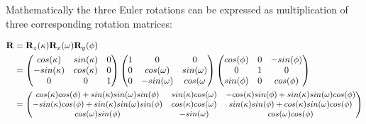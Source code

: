 \documentclass[a4paper,12pt]{article}
\newcommand{\ematr}[1]{
{\bf #1}
}
\newcommand{\escal}[1]{
{\it #1}
}
\begin{document}
Mathematically the three Euler rotations can be expressed as multiplication of three corresponding
rotation matrices:


 \begin{equation}
 \begin{split}
\ematr{R} &= \ematr{R}_{z}(\escal{\kappa}) \ematr{R}_{x}(\escal{\omega}) \ematr{R}_{y}(\escal{\phi}) \\
	  &= \begin{pmatrix}
	      cos(\escal{\kappa}) & sin(\escal{\kappa}) & 0 \\
	      -sin(\escal{\kappa}) & cos(\escal{\kappa}) & 0 \\
	      0 & 0 & 1
	      \end{pmatrix}
	      \begin{pmatrix}
	      1 & 0 & 0 \\
	      0 & cos(\escal{\omega}) & sin(\escal{\omega}) \\
	      0 & -sin(\escal{\omega}) & cos(\escal{\omega} 
	      \end{pmatrix}
	      \begin{pmatrix}
	      cos(\escal{\phi}) & 0 & -sin(\escal{\phi}) \\
	      0 & 1 & 0 \\
	      sin(\phi) & 0 & cos(\phi)      
	      \end{pmatrix} \\
	  &=  
	      \small
	      \begin{pmatrix}
	      cos(\escal{\kappa}) cos(\escal{\phi}) + sin(\escal{\kappa}) sin(\escal{\omega}) sin(\escal{\phi}) & 
	      sin(\escal{\kappa}) cos(\escal{\omega})  & 
	      -cos(\escal{\kappa}) sin(\escal{\phi}) + sin(\escal{\kappa}) sin(\escal{\omega}) cos(\escal{\phi}) 
	      \\
	      -sin(\escal{\kappa}) cos(\escal{\phi}) + sin(\escal{\kappa}) sin(\escal{\omega}) sin(\escal{\phi}) & 
	      cos(\escal{\kappa}) cos(\escal{\omega})  & 
	      sin(\escal{\kappa}) sin(\escal{\phi}) + cos(\escal{\kappa}) sin(\escal{\omega}) cos(\escal{\phi}) 
	      \\	      
	      cos(\escal{\omega}) sin(\escal{\phi}) & 
	      -sin(\escal{\omega})  & 
	      cos(\escal{\omega}) cos(\escal{\phi}) 
	      \\		      
	      \end{pmatrix} 
\end{split}
\end{equation}
\end{document}
